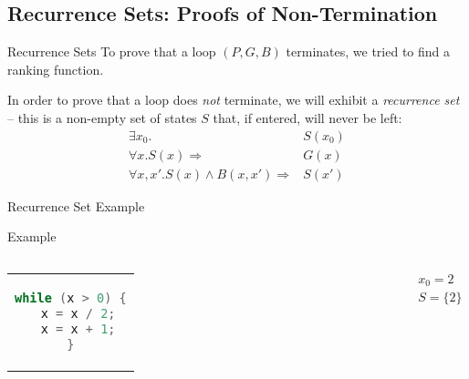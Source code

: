 \documentclass[xcolor=pdftex,t,11pt]{beamer}
\begin{document}
\subsection{Recurrence Sets: Proofs of Non-Termination}

\begin{frame}{Recurrence Sets}
 To prove that a loop $(P, G, B)$ terminates, we tried to find a ranking function.

 \vspace{1em}

 In order to prove that a loop does \emph{not} terminate, we will exhibit a \emph{recurrence set} --
 this is a non-empty set of states $S$ that, if entered, will never be left:
 \begin{align*}
  \exists x_0 . & S(x_0) \\
  \forall x . S(x) \Rightarrow & G(x) \\
  \forall x, x' . S(x) \wedge B(x, x') \Rightarrow & S(x')
 \end{align*}

\end{frame}


\begin{frame}[fragile]{Recurrence Set Example}
\begin{exampleblock}{Example}
\begin{center}
\begin{columns}[c]
  \begin{tabular}{c}
   \begin{lstlisting}[language=c,basicstyle=\normalsize]
while (x > 0) {
  x = x / 2;
  x = x + 1;
}
   \end{lstlisting}
  \end{tabular}
 \begin{gather*}
  x_0 = 2 \\
  S = \{ 2 \}
 \end{gather*}
\end{columns}
\end{center}
\end{exampleblock}
\end{frame}
\end{document}
